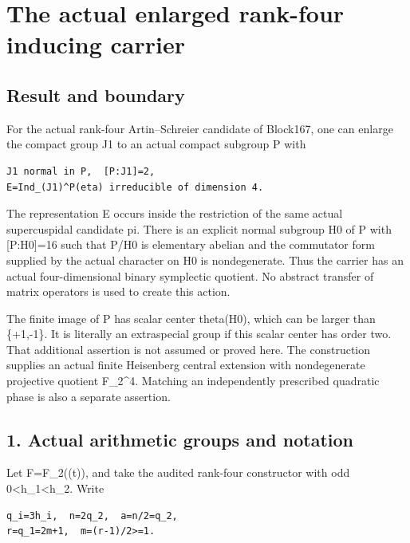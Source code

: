 \clearpage
\section{The actual enlarged rank-four inducing carrier}\label{app:rank~4}


\hypertarget{rank~4-result-and-boundary}{%
\subsection{Result and boundary}\label{rank~4-result-and-boundary}}

For the actual rank-four Artin--Schreier candidate of Block167, one can
enlarge the compact group J1 to an actual compact subgroup P with

\begin{Verbatim}[fontsize=\small,breaklines=true,breakanywhere=true]
J1 normal in P,  [P:J1]=2,
E=Ind_(J1)^P(eta) irreducible of dimension 4.
\end{Verbatim}

The representation E occurs inside the restriction of the same actual
supercuspidal candidate pi. There is an explicit normal subgroup H0 of P
with {[}P:H0{]}=16 such that P/H0 is elementary abelian and the
commutator form supplied by the actual character on H0 is nondegenerate.
Thus the carrier has an actual four-dimensional binary symplectic
quotient. No abstract transfer of matrix operators is used to create
this action.

The finite image of P has scalar center theta(H0), which can be larger
than \{+1,-1\}. It is literally an extraspecial group if this scalar
center has order two. That additional assertion is not assumed or proved
here. The construction supplies an actual finite Heisenberg central
extension with nondegenerate projective quotient F\_2\^{}4. Matching an
independently prescribed quadratic phase is also a separate assertion.

\hypertarget{rank~4-actual-arithmetic-groups-and-notation}{%
\subsection{1. Actual arithmetic groups and
notation}\label{rank~4-actual-arithmetic-groups-and-notation}}

Let F=F\_2((t)), and take the audited rank-four constructor with odd
0\textless h\_1\textless h\_2. Write

\begin{Verbatim}[fontsize=\small,breaklines=true,breakanywhere=true]
q_i=3h_i,  n=2q_2,  a=n/2=q_2,
r=q_1=2m+1,  m=(r-1)/2>=1.
\end{Verbatim}

